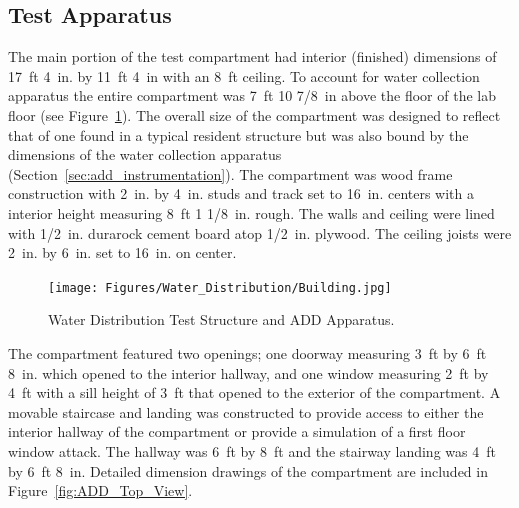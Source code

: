 \documentclass[12pt,oneside]{book}
\begin{document}
\subsection{Test Apparatus}
\label{ADD_discussion}
The main portion of the test compartment had interior (finished) dimensions of 17~ft 4~in. by 11~ft 4~in with an 8~ft ceiling. To account for water collection apparatus the entire compartment was 7~ft 10 7/8~in above the floor of the lab floor (see Figure~\ref{fig:Water_Distribution_Test_Structure_and_ADD_Apparatus}). The overall size of the compartment was designed to reflect that of one found in a typical resident structure but was also bound by the dimensions of the water collection apparatus (Section~\ref{sec:add_instrumentation}). The compartment was wood frame construction with 2~in. by 4~in. studs and track set to 16~in. centers with a interior height measuring 8~ft 1 1/8~in. rough. The walls and ceiling were lined with 1/2~in. durarock cement board atop 1/2~in. plywood. The ceiling joists were 2~in. by 6~in. set to 16~in. on center.

\begin{figure}[!ht]
	\centering
	\texttt{[image: Figures/Water\_Distribution/Building.jpg]}
	\caption[Water Distribution Test Structure and ADD Apparatus]{Water Distribution Test Structure and ADD Apparatus.}
	\label{fig:Water_Distribution_Test_Structure_and_ADD_Apparatus}
\end{figure}

The compartment featured two openings; one doorway measuring 3~ft by 6~ft 8~in. which opened to the interior hallway, and one window measuring 2~ft by 4~ft with a sill height of 3~ft that opened to the exterior of the compartment. A movable staircase and landing was constructed to provide access to either the interior hallway of the compartment or provide a simulation of a first floor window attack. The hallway was 6~ft by 8~ft and the stairway landing was 4~ft by 6~ft 8~in. Detailed dimension drawings of the compartment are included in Figure~\ref{fig:ADD_Top_View}.
\end{document}
